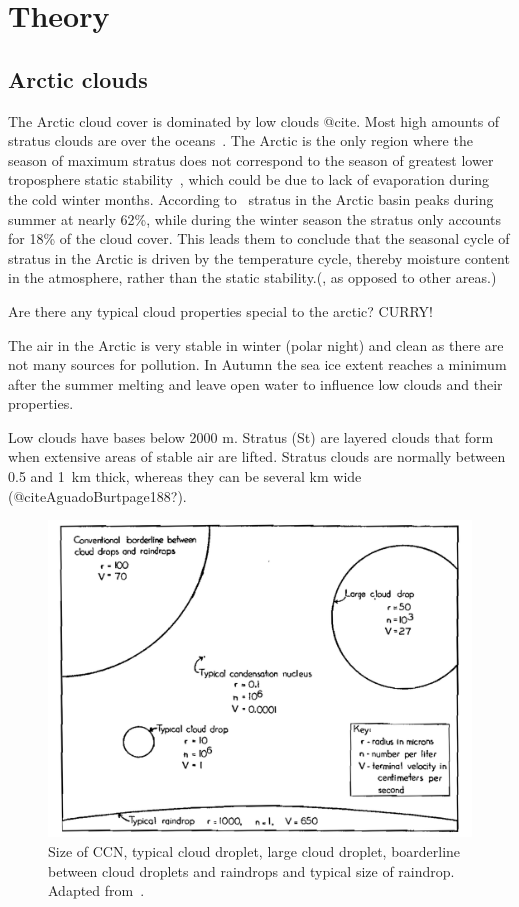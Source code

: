 \chapter{Theory}
\label{chap:theory}
\section{Arctic clouds}
The Arctic cloud cover is dominated by low clouds @cite. Most high amounts of stratus clouds are over the oceans~\citep{Klein1993}. The Arctic is the only region where the season of maximum stratus does not correspond to the season of greatest lower troposphere static stability~\citep{Klein1993}, which could be due to lack of evaporation during the cold winter months. According to~\cite{Klein1993} stratus in the Arctic basin peaks during summer at nearly 62\%, while during the winter season the stratus only accounts for 18\% of the cloud cover. This leads them to conclude that the seasonal cycle of stratus in the Arctic is driven by the temperature cycle, thereby moisture content in the atmosphere, rather than the static stability.(, as opposed to other areas.)

Are there any typical cloud properties special to the arctic? CURRY!


The air in the Arctic is very stable in winter (polar night) and clean as there are not many sources for pollution. In Autumn the sea ice extent reaches a minimum after the summer melting and leave open water to influence low clouds and their properties. 

Low clouds have bases below 2000 m. Stratus (St) are layered clouds that form when extensive areas of stable air are lifted. Stratus clouds are normally between 0.5 and 1~km thick, whereas they can be several km wide (@citeAguadoBurtpage188?).

\begin{figure}
\label{fig:dropletsize}
\centering
\includegraphics[width=1\textwidth]{dropletsize.png}
\caption{Size of CCN, typical cloud droplet, large cloud droplet, boarderline between cloud droplets and raindrops and typical size of raindrop. Adapted from~\citep{McDonald1958}.}
\label{fig:Schf01}
\end{figure}
 

